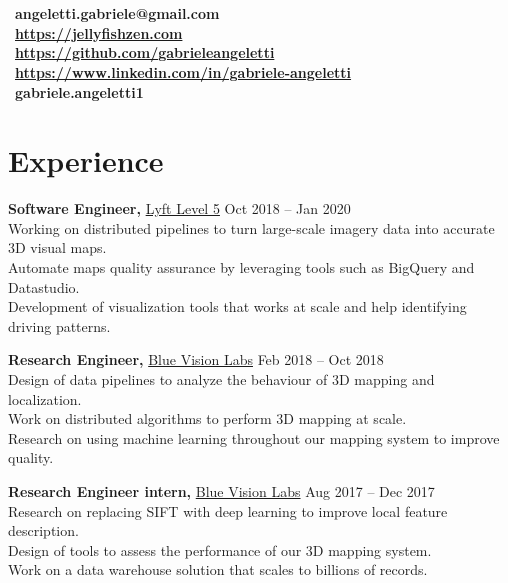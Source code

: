 \documentclass[margin]{res}
\begin{document}
    \address{London, UK  \\ (+44) 7803 056685}
    \begin{resume}
        \section{}
        \faEnvelope~\textbf{angeletti.gabriele@gmail.com} \\[5pt]
        \faGlobe~\textbf{\url{https://jellyfishzen.com}} \\[5pt]
        \faGithub~\textbf{\url{https://github.com/gabrieleangeletti}} \\[5pt]
        \faLinkedin~\textbf{\url{https://www.linkedin.com/in/gabriele-angeletti}} \\[5pt]
        \faSkype~\textbf{gabriele.angeletti1}

        \section{Experience}
            {\bf Software Engineer,} \href{https://www.lyft.com/self-driving-vehicles/}{Lyft Level 5}
            \hfill Oct 2018 -- Jan 2020\\
            Working on distributed pipelines to turn large-scale imagery data into accurate 3D visual maps.\\
            Automate maps quality assurance by leveraging tools such as BigQuery and Datastudio.\\
            Development of visualization tools that works at scale and help identifying driving patterns.

            {\bf Research Engineer,} \href{http://www.bluevisionlabs.com}{Blue Vision Labs} \hfill Feb 2018 -- Oct 2018\\
            Design of data pipelines to analyze the behaviour of 3D mapping and localization.\\
            Work on distributed algorithms to perform 3D mapping at scale.\\
            Research on using machine learning throughout our mapping system to improve quality.

            {\bf Research Engineer intern,} \href{http://www.bluevisionlabs.com}{Blue Vision Labs} \hfill Aug 2017 -- Dec 2017\\
            Research on replacing SIFT with deep learning to improve local feature description.\\
	        Design of tools to assess the performance of our 3D mapping system.\\
	        Work on a data warehouse solution that scales to billions of records.


\end{resume}
\end{document}
